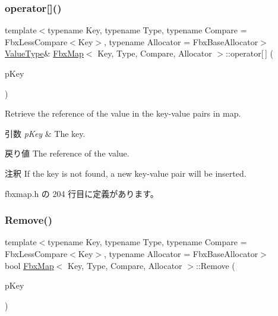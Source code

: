 \subsubsection{\texorpdfstring{operator[]()}{operator[]()}}
{\footnotesize\ttfamily template$<$typename Key, typename Type, typename Compare = Fbx\+Less\+Compare$<$\+Key$>$, typename Allocator = Fbx\+Base\+Allocator$>$ \\
\hyperlink{class_fbx_map_abea530b1192b31c3cf05fbf247e3dcaa}{Value\+Type}\& \hyperlink{class_fbx_map}{Fbx\+Map}$<$ Key, Type, Compare, Allocator $>$\+::operator\mbox{[}$\,$\mbox{]} (\begin{DoxyParamCaption}\item[{const \hyperlink{class_fbx_map_ad8392c83b6f8eeb9e0706bcc8674270a}{Key\+Type} \&}]{p\+Key }\end{DoxyParamCaption})\hspace{0.3cm}{\ttfamily [inline]}}

Retrieve the reference of the value in the key-\/value pairs in map. 
\begin{DoxyParams}{引数}
{\em p\+Key} & The key. \\
\hline
\end{DoxyParams}
\begin{DoxyReturn}{戻り値}
The reference of the value. 
\end{DoxyReturn}
\begin{DoxyRemark}{注釈}
If the key is not found, a new key-\/value pair will be inserted. 
\end{DoxyRemark}


 fbxmap.\+h の 204 行目に定義があります。

\mbox{\label{class_fbx_map_ae4d2e72014223a8292472394d80e4909}} 
\subsubsection{\texorpdfstring{Remove()}{Remove()}}
{\footnotesize\ttfamily template$<$typename Key, typename Type, typename Compare = Fbx\+Less\+Compare$<$\+Key$>$, typename Allocator = Fbx\+Base\+Allocator$>$ \\
bool \hyperlink{class_fbx_map}{Fbx\+Map}$<$ Key, Type, Compare, Allocator $>$\+::Remove (\begin{DoxyParamCaption}\item[{const \hyperlink{class_fbx_map_ad8392c83b6f8eeb9e0706bcc8674270a}{Key\+Type} \&}]{p\+Key }\end{DoxyParamCaption})\hspace{0.3cm}{\ttfamily [inline]}}

